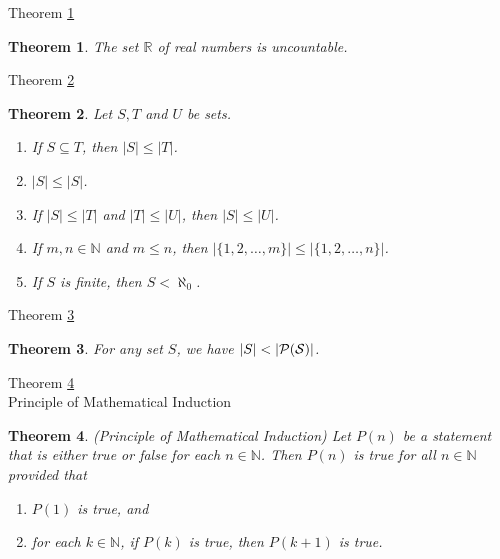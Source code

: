 \documentclass[avery5371,grid]{flashcards}
\newtheorem{theorem}{Theorem}
\newcommand{\bb}[1]{\mathbb{#1}}
\newcommand{\R}{\bb{R}}
\newcommand{\N}{\bb{N}}
\begin{document}
\begin{flashcard}[Theorem]{Theorem \ref{thm17}}
\begin{theorem}
\label{thm17}
The set $\R$ of real numbers is uncountable.
\end{theorem}
\end{flashcard}

\begin{flashcard}[Theorem]{Theorem \ref{thm18}}
\begin{theorem}
\label{thm18}
Let $S, T$ and $U$ be sets.
\begin{enumerate}
\item If $S \subseteq T$, then $|S| \leq |T|$.
\item $|S| \leq |S|$.
\item If $|S|\leq |T|$ and $|T| \leq |U|$, then $|S| \leq |U|$.
\item If $m, n \in \N$ and $m \leq n$, then $|\{ 1, 2, \ldots , m \} |
\leq |\{ 1, 2, \ldots , n\} |$.
\item If $S$ is finite, then $S < \aleph _0$. 
\end{enumerate}
\end{theorem}
\end{flashcard}

\begin{flashcard}[Theorem]{Theorem \ref{thm19}}
\begin{theorem}
\label{thm19}
For any set $S$, we have $|S| < |\cal{P}(S)|$.
\end{theorem}
\end{flashcard}


\begin{flashcard}[Theorem]{Theorem \ref{thm20} \\ Principle of
Mathematical Induction}
\begin{theorem}
\label{thm20}
(Principle of Mathematical Induction)  Let $P(n)$ be a statement that is
either true or false for each $n \in \N$.  Then $P(n)$ is true for all
$n \in \N$ provided that
\begin{enumerate}
\item $P(1)$ is true, and
\item for each $k \in \N$, if $P(k)$ is true, then $P(k+1)$ is true.
\end{enumerate}
\end{theorem}
\end{flashcard}
\end{document}
